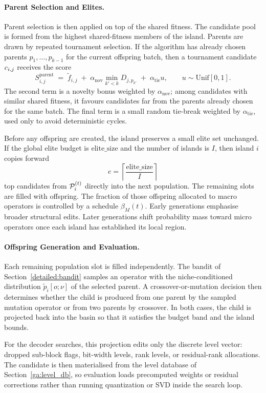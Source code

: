 \paragraph{Parent Selection and Elites.}
Parent selection is then applied on top of the shared fitness. The candidate pool is formed from the highest shared-fitness members of the island. Parents are drawn by repeated tournament selection. If the algorithm has already chosen parents $p_1,\ldots,p_{k-1}$ for the current offspring batch, then a tournament candidate $c_{i,j}$ receives the score
\[
S_{i,j}^{\mathrm{parent}}
\;=\;
\tilde f_{i,j}
\;+\;
\alpha_{\mathrm{nov}}
\min_{k' < k} D_{j,p_{k'}}
\;+\;
\alpha_{\mathrm{tie}}u,
\qquad
u \sim \mathrm{Unif}[0,1].
\]
The second term is a novelty bonus weighted by $\alpha_{\mathrm{nov}}$; among candidates with similar shared fitness, it favours candidates far from the parents already chosen for the same batch. The final term is a small random tie-break weighted by $\alpha_{\mathrm{tie}}$, used only to avoid deterministic cycles.

Before any offspring are created, the island preserves a small elite set unchanged. If the global elite budget is $\mathrm{elite\_size}$ and the number of islands is $I$, then island $i$ copies forward
\[
e = \left\lceil \frac{\mathrm{elite\_size}}{I} \right\rceil
\]
top candidates from $\mathcal{P}_i^{(t)}$ directly into the next population. The remaining slots are filled with offspring. The fraction of those offspring allocated to macro operators is controlled by a schedule $\beta_M(t)$. Early generations emphasise broader structural edits. Later generations shift probability mass toward micro operators once each island has established its local region.

\paragraph{Offspring Generation and Evaluation.}
Each remaining population slot is filled independently. The bandit of Section~\ref{detailed:bandit} samples an operator with the niche-conditioned distribution $\tilde p_i[o;\nu]$ of the selected parent. A crossover-or-mutation decision then determines whether the child is produced from one parent by the sampled mutation operator or from two parents by crossover. In both cases, the child is projected back into the basin so that it satisfies the budget band and the island bounds.

For the decoder searches, this projection edits only the discrete level vector: dropped sub-block flags, bit-width levels, rank levels, or residual-rank allocations. The candidate is then materialised from the level database of Section~\ref{ga:level_db}, so evaluation loads precomputed weights or residual corrections rather than running quantization or SVD inside the search loop.

